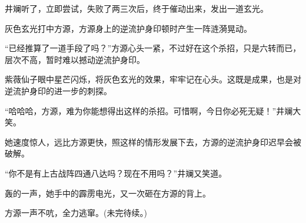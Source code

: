 \begin{this_body}
井斓听了，立即尝试，失败了两三次后，终于催动出来，发出一道玄光。

灰色玄光打中方源，方源身上的逆流护身印顿时产生一阵涟漪晃动。

“已经推算了一道手段了吗？”方源心头一紧，不过好在这个杀招，只是六转而已，层次不高，暂时难以撼动逆流护身印。

紫薇仙子眼中星芒闪烁，将灰色玄光的效果，牢牢记在心头。这既是成果，也是对逆流护身印的进一步的刺探。

“哈哈哈，方源，难为你能想得出这样的杀招。可惜啊，今日你必死无疑！”井斓大笑。

她速度惊人，远比方源更快，照这样的情形发展下去，方源的逆流护身印迟早会被破解。

“你不是有上古战阵四通八达吗？现在不用吗？”井斓又笑道。

轰的一声，她手中的霹雳电光，又一次砸在方源的背上。

方源一声不吭，全力逃窜。(未完待续。)

\end{this_body}

